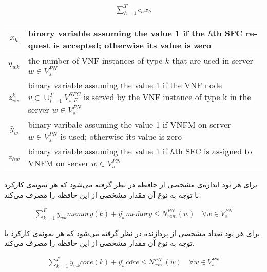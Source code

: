 \begin{latin}\begin{align}
    \sum_{h=1}^{T} c_hx_h
\end{align}\end{latin}



\begin{center}\begin{latin}\begin{tabular}{|c|p{10cm}|}
    \hline
    $x_h$ & binary variable assuming the value 1 if the $h$th SFC request is accepted; otherwise its value is zero \\
    \hline
    $y_{wk}$ & the number of VNF instances of type $k$ that are used in server $w \in V_s^{PN}$ \\
    \hline
    $z^k_{vw}$ & binary variable assuming the value 1 if the VNF node $v \in \cup_{i=1}^{T} V_{i, F}^{SFC}$ is served by the VNF instance of type k in the server $w \in V_s^{PN}$ \\
    \hline
    $\bar{y}_w$ & binary varibale assuming the value 1 if VNFM on server $w \in V_s^{PN}$ is used; otherwise its value is zero\\
    \hline
    $\bar{z}_{hw}$ & binary variable assuming the value 1 if $h$th SFC is assigned to VNFM on server $w \in V_s^{PN}$\\
    \hline
\end{tabular}\end{latin}\end{center}

برای هر نود اندازه‌ی مشخصی از حافظه 
در نظر گرفته می‌شود که هر نمونه‌ی کارکرد با توجه به نوع آن مقدار مشخصی از این حافظه را مصرف می‌کند.
\begin{latin}\begin{align}
    \sum_{k=1}^F y_{wk} memory(k) + \bar{y_w} \bar{memory} \le N_{ram}^{PN}(w)
    \quad
    \forall w \in V_s^{PN}
\end{align}\end{latin}

برای هر نود تعداد مشخصی از پردازنده در نظر گرفته می‌شود که هر نمونه‌ی کارکرد با توجه به نوع آن مقدار مشخصی از این حافظه را مصرف می‌کند.
\begin{latin}\begin{align}
    \sum_{k=1}^F y_{wk} core(k) + \bar{y_w} \bar{core} \le N_{core}^{PN}(w)
    \quad
    \forall w \in V_s^{PN}
\end{align}\end{latin}

